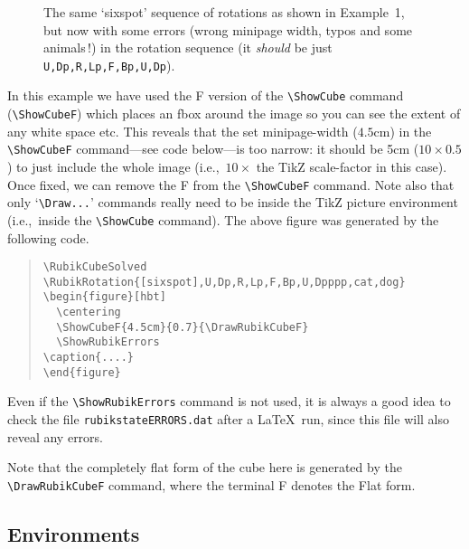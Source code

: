 \documentclass[a4paper]{article}
\begin{document}

\RubikCubeSolved
{}

\begin{figure}[hbt]
  \centering
  \ShowRubikErrors
\parbox{0.8\textwidth}{%
\caption{\label{fig:cubeincubeE}The same `sixspot' sequence of rotations as shown 
in Example~1,  but now with some   errors (wrong minipage width, typos and some 
animals\,!) in the rotation sequence (it \textit{should} be just 
\texttt{U,Dp,R,Lp,F,Bp,U,Dp}).}}
\end{figure}

{\noindent}In this example we have used the F version of the \verb!\ShowCube! 
command (\verb!\ShowCubeF!)  which places an fbox around the image so you can see the 
extent of any white space etc. This reveals that the set minipage-width ($4.5$cm) in 
the \verb!\ShowCubeF! command---see code below---is too narrow: it should be 
5cm ($10 \times 0.5$) to just include the whole image (i.e.,~$10 \times$ the TikZ 
scale-factor in this case). 
Once fixed, we can remove the F from the \verb!\ShowCubeF! command.
Note also  that only `\verb!\Draw...!' commands really need to be inside the TikZ 
picture environment (i.e.,~inside the \verb!\ShowCube! command). The above figure 
was generated by the following code.
\begin{quote}
\begin{verbatim}
\RubikCubeSolved
\RubikRotation{[sixspot],U,Dp,R,Lp,F,Bp,U,Dpppp,cat,dog}
\begin{figure}[hbt]
  \centering
  \ShowCubeF{4.5cm}{0.7}{\DrawRubikCubeF}
  \ShowRubikErrors
\caption{....}
\end{figure}
\end{verbatim}
\end{quote}
Even if the \verb!\ShowRubikErrors! command is not used, it is always a good idea 
to check the file \verb!rubikstateERRORS.dat! after a \LaTeX\ run, since this 
file will also reveal any  errors.

Note that the completely flat form of the cube here is generated by the
 \verb!\DrawRubikCubeF! command, where the terminal F denotes the Flat form.



\pagebreak

\subsection{Environments}
\end{document}
